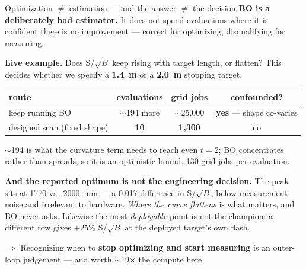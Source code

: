 \documentclass[aspectratio=169,10pt]{beamer}
\begin{document}
\begin{frame}{Optimization $\neq$ estimation --- and the answer $\neq$ the decision}
\small
\textbf{BO is a deliberately bad estimator.} It does not spend evaluations where it is
confident there is no improvement --- correct for optimizing, disqualifying for
measuring.
\vspace{0.5em}

\textbf{Live example.} Does S/$\sqrt{B}$ keep rising with target length, or flatten?
This decides whether we specify a \textbf{1.4~m} or a \textbf{2.0~m} stopping target.
\vspace{0.3em}
\begin{center}
\begin{tabular}{@{}lccc@{}}
\toprule
route & evaluations & grid jobs & confounded? \\
\midrule
keep running BO & $\sim$194 more & $\sim$25{,}000 & \textbf{yes} --- shape co-varies \\
designed scan (fixed shape) & \textbf{10} & \textbf{1{,}300} & no \\
\bottomrule
\end{tabular}
\end{center}
\vspace{0.2em}
{\scriptsize $\sim$194 is what the curvature term needs to reach even $t{=}2$; BO
concentrates rather than spreads, so it is an optimistic bound. 130 grid jobs per
evaluation.}
\vspace{0.6em}

\textbf{And the reported optimum is not the engineering decision.} The peak sits at
1770 vs.\ 2000~mm --- a 0.017 difference in S/$\sqrt{B}$, below measurement noise and
irrelevant to hardware. \emph{Where the curve flattens} is what matters, and BO never
asks. Likewise the most \emph{deployable} point is not the champion: a different row
gives $+25\%$ S/$\sqrt{B}$ at the deployed target's own flash.
\vspace{0.4em}

$\Rightarrow$ Recognizing when to \textbf{stop optimizing and start measuring} is an
outer-loop judgement --- and worth $\sim$19$\times$ the compute here.
\end{frame}
\end{document}
